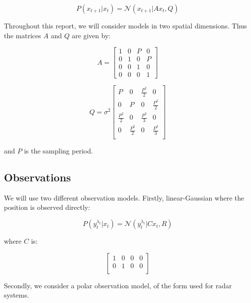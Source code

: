 \begin{equation}
P(x_{t+1}|x_{t}) = \mathcal{N}(x_{t+1}|A x_{t},Q)
\label{eq:}
\end{equation}

Throughout this report, we will consider models in two spatial dimensions. Thus the matrices $A$ and $Q$ are given by:

\begin{equation}
A = \begin{bmatrix}
1 & 0 & P & 0 \\
0 & 1 & 0 & P \\
0 & 0 & 1 & 0 \\
0 & 0 & 0 & 1
\end{bmatrix}
\label{eq:}
\end{equation}

\begin{equation}
Q = \sigma^2 \begin{bmatrix}
P & 0 & \frac{P^2}{2} & 0 \\
0 & P & 0 & \frac{P^2}{2} \\
\frac{P^2}{2} & 0 & \frac{P^3}{3} & 0 \\
0 & \frac{P^2}{2} & 0 & \frac{P^3}{3} \\
\end{bmatrix}
\label{eq:}
\end{equation}

and $P$ is the sampling period.

\subsection{Observations}
We will use two different observation models. Firstly, linear-Gaussian where the position is observed directly:

\begin{equation}
P(y_t^{\lambda_t}|x_t) = \mathcal{N}(y_t^{\lambda_t}|C x_t, R)
\label{eq:}
\end{equation}

where $C$ is:

\begin{equation}
\begin{bmatrix}
1 & 0 & 0 & 0 \\
0 & 1 & 0 & 0 \\
\end{bmatrix}
\label{eq:}
\end{equation}

Secondly, we consider a polar observation model, of the form used for radar systems.

